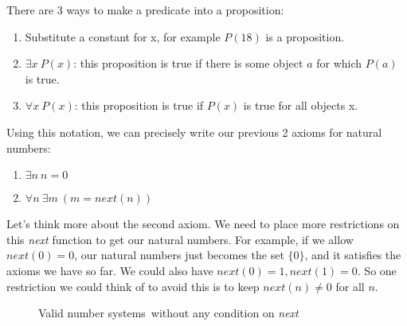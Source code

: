 \documentclass[a4paper,10pt]{article}
\theoremstyle{definition} %
\begin{document}
    There are 3 ways to make a predicate into a proposition:
    \begin{enumerate}
        \item Substitute a constant for x, for example $P(18)$ is a proposition.
        \item $\exists x \ P(x)$: this proposition is true if there is some object
        $a$ for which $P(a)$ is true.
        \item $\forall x \ P(x)$: this proposition is true if $P(x)$ is true for all
        objects x. 
    \end{enumerate}

    Using this notation, we can precisely write our previous 2 axioms for natural numbers:
    \begin{tcolorbox}[colback=blue!10!white, colframe=blue!50!black]
    \begin{enumerate}
        \item $\exists n \ n = 0$
        \item $\forall n \ \exists m \ (m = next(n))$
    \end{enumerate}
    \end{tcolorbox}

    Let's think more about the second axiom. We need to place more restrictions on this 
    \emph{next} function to get our natural numbers. For example, if we allow $next(0) = 0$, 
    our natural numbers just becomes the set $\{0\}$, and it satisfies the axioms we have so far.
    We could also have $next(0) = 1, next(1) = 0$. So one restriction we could think of to
    avoid this is to keep $next(n) \neq 0$ for all $n$.

    \begin{figure}[ht]
    \centering

    \caption[Caption for LOF]{Valid number systems\footnotemark\ without any condition
    on \emph{next}}
    \end{figure}
\end{document}
